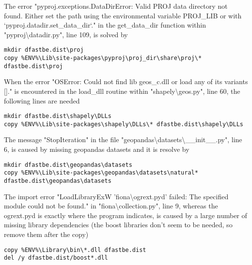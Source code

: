 The error "pyproj.exceptions.DataDirError: Valid PROJ data directory not found. Either set the path using the environmental variable PROJ\_LIB or with `pyproj.datadir.set\_data\_dir`." in the get\_data\_dir function within "pyproj\textbackslash{}datadir.py", line 109, is solved by

\begin{Verbatim}
mkdir dfastbe.dist\proj
copy %ENV%\Lib\site-packages\pyproj\proj_dir\share\proj\* dfastbe.dist\proj
\end{Verbatim}

When the error "OSError: Could not find lib geos\_c.dll or load any of its variants []." is encountered in the load\_dll routine within "shapely\textbackslash{}geos.py", line 60, the following lines are needed

\begin{Verbatim}
mkdir dfastbe.dist\shapely\DLLs
copy %ENV%\Lib\site-packages\shapely\DLLs\* dfastbe.dist\shapely\DLLs
\end{Verbatim}

The message "StopIteration" in the file "geopandas\textbackslash{}datasets\textbackslash{}\_\_init\_\_.py", line 6, is caused by missing geopandas datasets and it is resolve by

\begin{Verbatim}
mkdir dfastbe.dist\geopandas\datasets
copy %ENV%\Lib\site-packages\geopandas\datasets\natural* dfastbe.dist\geopandas\datasets
\end{Verbatim}

%

The import error "LoadLibraryExW 'fiona\textbackslash{}ogrext.pyd' failed: The specified module could not be found." in "fiona\textbackslash{}collection.py", line 9, whereas the ogrext.pyd is exactly where the program indicates, is caused by a large number of missing library dependencies (the boost libraries don't seem to be needed, so remove them after the copy)

\begin{Verbatim}
copy %ENV%\Library\bin\*.dll dfastbe.dist
del /y dfastbe.dist/boost*.dll
\end{Verbatim}

